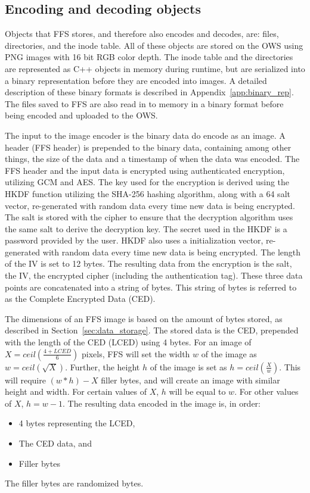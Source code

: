 \subsection{Encoding and decoding objects}
\label{subsec:file_enc_dec}
Objects that FFS stores, and therefore also encodes and decodes, are: files, directories, and the inode table. All of these objects are stored on the OWS using PNG images with 16 bit RGB color depth. The inode table and the directories are represented as C++ objects in memory during runtime, but are serialized into a binary representation before they are encoded into images. A detailed description of these binary formats is described in Appendix~\ref{app:binary_rep}. The files saved to FFS are also read in to memory in a binary format before being encoded and uploaded to the OWS. 

The input to the image encoder is the binary data do encode as an image. A header (FFS header) is prepended to the binary data, containing among other things, the size of the data and a timestamp of when the data was encoded. The FFS header and the input data is encrypted using authenticated encryption, utilizing GCM and AES. The key used for the encryption is derived using the HKDF function utilizing the SHA-256 hashing algorithm, along with a \SI{64}{\byte} salt vector, re-generated with random data every time new data is being encrypted. The salt is stored with the cipher to ensure that the decryption algorithm uses the same salt to derive the decryption key. The secret used in the HKDF is a password provided by the user. HKDF also uses a initialization vector, re-generated with random data every time new data is being encrypted. The length of the IV is set to 12 bytes. The resulting data from the encryption is the salt, the IV, the encrypted cipher (including the authentication tag). These three data points are concatenated into a string of bytes. This string of bytes is referred to as the Complete Encrypted Data (\gls{CED}).

The dimensions of an FFS image is based on the amount of bytes stored, as described in Section~\ref{sec:data_storage}. The stored data is the CED, prepended with the length of the CED (\gls{LCED}) using 4 bytes. For an image of $X = ceil(\frac{4 + LCED}{6})$ pixels, FFS will set the width $w$ of the image as $w = ceil(\sqrt{X})$. Further, the height $h$ of the image is set as $h = ceil(\frac{X}{w})$. This will require $(w * h) - X$ filler bytes, and will create an image with similar height and width. For certain values of $X$, $h$ will be equal to $w$. For other values of $X$, $h = w-1$. The resulting data encoded in the image is, in order:
\begin{itemize}
	\item 4 bytes representing the LCED,
	\item The CED data, and
	\item Filler bytes
\end{itemize}
The filler bytes are randomized bytes.

